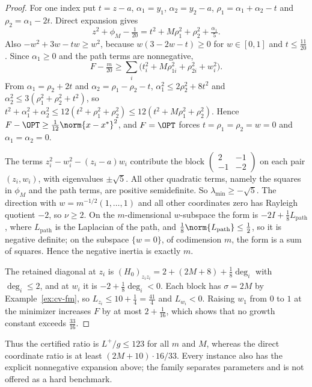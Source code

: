 \begin{proof}
For one index put $t=z-a$, $\alpha_1=y_1$, $\alpha_2=y_2-a$,
$\rho_1=\alpha_1+\alpha_2-t$ and $\rho_2=\alpha_1-2t$. Direct expansion
gives
\[
z^2+\phi_M-\tfrac1{20}=t^2+M\rho_1^2+\rho_2^2+\tfrac{\alpha_1}5.
\]
Also $-w^2+3w-tw\ge w^2$, because $w(3-2w-t)\ge0$ for $w\in[0,1]$ and
$t\le\frac{11}{20}$. Since $\alpha_1\ge0$ and the path terms are
nonnegative,
\[
F-\tfrac m{20}\ge\sum_i\bigl(t_i^2+M\rho_{1i}^2+\rho_{2i}^2+w_i^2\bigr).
\]
From $\alpha_1=\rho_2+2t$ and $\alpha_2=\rho_1-\rho_2-t$,
$\alpha_1^2\le2\rho_2^2+8t^2$ and $\alpha_2^2\le3(\rho_1^2+\rho_2^2+t^2)$, so
$t^2+\alpha_1^2+\alpha_2^2\le12(t^2+\rho_1^2+\rho_2^2)\le12(t^2+M\rho_1^2+\rho_2^2)$.
Hence $F-\OPT\ge\frac1{12}\norm{x-x^*}^2$, and $F=\OPT$ forces
$t=\rho_1=\rho_2=w=0$ and $\alpha_1=\alpha_2=0$.

The terms $z_i^2-w_i^2-(z_i-a)w_i$ contribute the block
$\left(\begin{smallmatrix}2&-1\\-1&-2\end{smallmatrix}\right)$ on each pair
$(z_i,w_i)$, with eigenvalues $\pm\sqrt5$. All other quadratic terms, namely
the squares in $\phi_M$ and the path terms, are positive semidefinite. So
$\lambda_{\min}\ge-\sqrt5$. The direction with $w=m^{-1/2}(1,\ldots,1)$ and
all other coordinates zero has Rayleigh quotient $-2$, so $\nu\ge2$. On the
$m$-dimensional $w$-subspace the form is $-2I+\frac18L_{\mathrm{path}}$, where
$L_{\mathrm{path}}$ is the Laplacian of the path, and
$\frac18\norm{L_{\mathrm{path}}}\le\frac12$, so it is negative definite; on
the subspace $\{w=0\}$, of codimension $m$, the form is a sum of squares.
Hence the negative inertia is exactly $m$.

The retained diagonal at $z_i$ is
$(H_0)_{z_iz_i}=2+(2M+8)+\frac18\deg_i$ with $\deg_i\le2$, and at $w_i$ it
is $-2+\frac18\deg_i<0$. Each block has $\sigma=2M$ by
Example~\ref{ex:cv-fm}, so $L_{z_i}\le10+\frac14=\frac{41}4$ and
$L_{w_i}<0$. Raising $w_1$ from $0$ to $1$ at the minimizer increases $F$ by
at most $2+\frac1{16}$, which shows that no growth constant exceeds
$\frac{33}{16}$.
\end{proof}

Thus the certified ratio is $L^+/g\le123$ for all $m$ and $M$, whereas the
direct coordinate ratio is at least $(2M+10)\cdot16/33$. Every instance also
has the explicit nonnegative expansion above; the family separates
parameters and is not offered as a hard benchmark.

